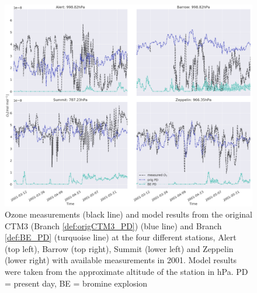 \begin{figure}
    \centering
    \includegraphics[width = \linewidth]{Chapter6_Results/images/ozone_2001_compObsOrigBE.png}
    \caption{Ozone measurements (black line) and model results from the original CTM3 (Branch \ref{def:origCTM3_PD}) (blue line) and Branch \ref{def:BE_PD} (turquoise line) at the four different stations, Alert (top left), Barrow (top right), Summit (lower left) and Zeppelin (lower right) with available measurements in 2001. Model results were taken from the approximate altitude of the station in hPa. PD = present day, BE = bromine explosion}
    \label{fig:CompObsOrigBE}
\end{figure}